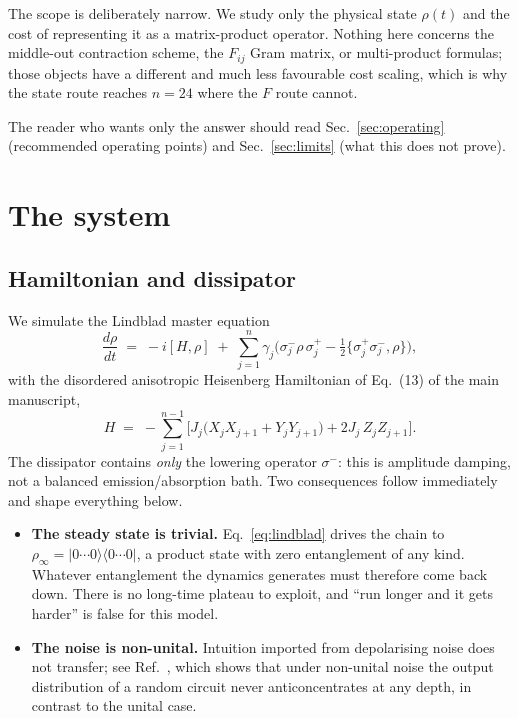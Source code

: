 \documentclass[11pt,a4paper]{article}
\begin{document}
The scope is deliberately narrow. We study only the physical state
$\rho(t)$ and the cost of representing it as a matrix-product operator. Nothing
here concerns the middle-out contraction scheme, the $F_{ij}$ Gram matrix, or
multi-product formulas; those objects have a different and much less favourable
cost scaling, which is why the state route reaches $n=24$ where the $F$ route
cannot.

The reader who wants only the answer should read
Sec.~\ref{sec:operating} (recommended operating points) and
Sec.~\ref{sec:limits} (what this does not prove).

\section{The system}

\subsection{Hamiltonian and dissipator}

We simulate the Lindblad master equation
\begin{equation}
  \frac{d\rho}{dt} \;=\; -i[H,\rho]
  \;+\; \sum_{j=1}^{n}\gamma_j\Big(\sigma^-_j\rho\,\sigma^+_j
        -\tfrac12\{\sigma^+_j\sigma^-_j,\rho\}\Big),
  \label{eq:lindblad}
\end{equation}
with the disordered anisotropic Heisenberg Hamiltonian of
Eq.~(13) of the main manuscript,
\begin{equation}
  H \;=\; -\sum_{j=1}^{n-1}\Big[
      J_j\big(X_jX_{j+1}+Y_jY_{j+1}\big) + 2J_j\,Z_jZ_{j+1}\Big].
  \label{eq:H}
\end{equation}
The dissipator contains \emph{only} the lowering operator $\sigma^-$: this is
amplitude damping, not a balanced emission/absorption bath. Two consequences
follow immediately and shape everything below.

\begin{itemize}[leftmargin=1.4em,itemsep=2pt]
\item \textbf{The steady state is trivial.} Eq.~\eqref{eq:lindblad} drives the
  chain to $\rho_\infty=|0\cdots0\rangle\langle0\cdots0|$, a product state with
  zero entanglement of any kind. Whatever entanglement the dynamics generates
  must therefore come back down. There is no long-time plateau to exploit, and
  ``run longer and it gets harder'' is false for this model.
\item \textbf{The noise is non-unital.} Intuition imported from depolarising
  noise does not transfer; see Ref.~\cite{fefferman2024nonunital}, which shows
  that under non-unital noise the output distribution of a random circuit never
  anticoncentrates at any depth, in contrast to the unital case.
\end{itemize}
\end{document}
